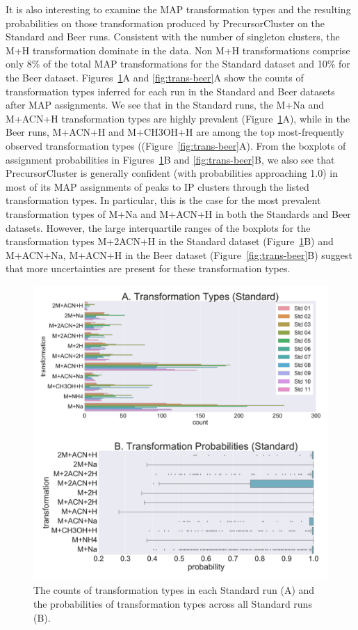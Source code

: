It is also interesting to examine the MAP transformation types and the resulting probabilities on those transformation produced by PrecursorCluster on the Standard and Beer runs. Consistent with the number of singleton clusters, the M+H transformation dominate in the data. Non M+H transformations comprise only 8\% of the total MAP transformations for the Standard dataset and 10\% for the Beer dataset. Figures~\ref{fig:trans-standards}A and \ref{fig:trans-beer}A show the counts of transformation types inferred for each run in the Standard and Beer datasets after MAP assignments. We see that in the Standard runs, the M+Na and M+ACN+H transformation types are highly prevalent (Figure~\ref{fig:trans-standards}A), while in the Beer runs, M+ACN+H and M+CH3OH+H are among the top most-frequently observed transformation types ((Figure~\ref{fig:trans-beer}A). From the boxplots of assignment probabilities in Figures~\ref{fig:trans-standards}B and \ref{fig:trans-beer}B, we also see that PrecursorCluster is generally confident (with probabilities approaching 1.0) in most of its MAP assignments of peaks to IP clusters through the listed transformation types. In particular, this is the case for the most prevalent transformation types of M+Na and M+ACN+H in both the Standards and Beer datasets. However, the large interquartile ranges of the boxplots for the transformation types M+2ACN+H in the Standard dataset (Figure~\ref{fig:trans-standards}B) and M+ACN+Na, M+ACN+H in the Beer dataset (Figure~\ref{fig:trans-beer}B) suggest that more uncertainties are present for these transformation types. 

\begin{figure}[!htbp]
\centering
\includegraphics[width=1.0\linewidth]{05-precursor-cluster/figures/trans_Standard.pdf}
\caption{\label{fig:trans-standards} The counts of transformation types in each Standard run (A) and the probabilities of transformation types across all Standard runs (B).}
\end{figure}

